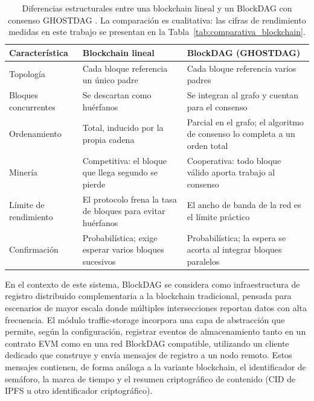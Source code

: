 \begin{table}[htbp]
\centering
\caption{Diferencias estructurales entre una blockchain lineal y un BlockDAG con consenso GHOSTDAG \cite{sompolinsky2021phantom,zhang2025sok}. La comparación es cualitativa: las cifras de rendimiento medidas en este trabajo se presentan en la Tabla~\ref{tab:comparativa_blockchain}.}
\label{tab:blockchain_vs_blockdag}
\renewcommand{\arraystretch}{1.3}
\footnotesize
\begin{tabular}{@{}p{2.9cm}p{5.6cm}p{5.6cm}@{}}
\toprule
\textbf{Característica} & \textbf{Blockchain lineal} & \textbf{BlockDAG (GHOSTDAG)} \\
\midrule
Topología
  & Cada bloque referencia un único padre
  & Cada bloque referencia varios padres \\
Bloques concurrentes
  & Se descartan como huérfanos
  & Se integran al grafo y cuentan para el consenso \\
Ordenamiento
  & Total, inducido por la propia cadena
  & Parcial en el grafo; el algoritmo de consenso lo completa a un orden total \\
Minería
  & Competitiva: el bloque que llega segundo se pierde
  & Cooperativa: todo bloque válido aporta trabajo al consenso \\
Límite de rendimiento
  & El protocolo frena la tasa de bloques para evitar huérfanos
  & El ancho de banda de la red es el límite práctico \\
Confirmación
  & Probabilística; exige esperar varios bloques sucesivos
  & Probabilística; la espera se acorta al integrar bloques paralelos \\
\bottomrule
\end{tabular}
\end{table}

En el contexto de este sistema, BlockDAG se considera como infraestructura de registro distribuido complementaria a la blockchain tradicional, pensada para escenarios de mayor escala donde múltiples intersecciones reportan datos con alta frecuencia. El módulo traffic-storage incorpora una capa de abstracción que permite, según la configuración, registrar eventos de almacenamiento tanto en un contrato EVM como en una red BlockDAG compatible, utilizando un cliente dedicado que construye y envía mensajes de registro a un nodo remoto. Estos mensajes contienen, de forma análoga a la variante blockchain, el identificador de semáforo, la marca de tiempo y el resumen criptográfico de contenido (CID de IPFS u otro identificador criptográfico).


